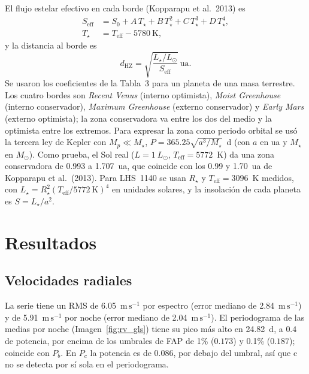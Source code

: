 \documentclass[twocolumn,aps,pra,11pt]{revtex4-2}
\newcommand{\Msun}{\ensuremath{M_\odot}}
\newcommand{\Lsun}{\ensuremath{L_\odot}}
\newcommand{\ms}{\ensuremath{\mathrm{m\,s^{-1}}}}
\begin{document}
El flujo estelar efectivo en cada borde (Kopparapu et al.\ 2013) es
\begin{equation}
  \begin{split}
  S_\mathrm{eff} &= S_0 + A\,T_\star + B\,T_\star^2 + C\,T_\star^3 + D\,T_\star^4,\\
  T_\star &= T_\mathrm{eff} - 5780~\mathrm{K},
  \end{split}
  \label{eq:seff}
\end{equation}
y la distancia al borde es
\begin{equation}
  d_\mathrm{HZ} = \sqrt{\frac{L_\star/\Lsun}{S_\mathrm{eff}}}~\mathrm{ua}.
  \label{eq:dhz}
\end{equation}
Se usaron los coeficientes de la Tabla~3 para un planeta de una masa terrestre. Los cuatro bordes son \emph{Recent Venus} (interno optimista), \emph{Moist Greenhouse} (interno conservador), \emph{Maximum Greenhouse} (externo conservador) y \emph{Early Mars} (externo optimista); la zona conservadora va entre los dos del medio y la optimista entre los extremos. Para expresar la zona como periodo orbital se usó la tercera ley de Kepler con $M_p \ll M_\star$, $P = 365.25\sqrt{a^3/M_\star}$~d (con $a$ en ua y $M_\star$ en \Msun). Como prueba, el Sol real ($L = 1~\Lsun$, $T_\mathrm{eff} = 5772$~K) da una zona conservadora de 0.993 a 1.707~ua, que coincide con los 0.99 y 1.70~ua de Kopparapu et al.\ (2013). Para LHS~1140 se usan $R_\star$ y $T_\mathrm{eff}=3096$~K medidos, con $L_\star = R_\star^2 (T_\mathrm{eff}/5772~\mathrm{K})^4$ en unidades solares, y la insolación de cada planeta es $S = L_\star/a^2$.

\section{Resultados}

\subsection{Velocidades radiales}

La serie tiene un RMS de 6.05~\ms{} por espectro (error mediano de 2.84~\ms) y de 5.91~\ms{} por noche (error mediano de 2.04~\ms). El periodograma de las medias por noche (Imagen~\ref{fig:rv_gls}) tiene su pico más alto en 24.82~d, a $0.4$ de potencia, por encima de los umbrales de FAP de 1\% ($0.173$) y 0.1\% ($0.187$); coincide con $P_b$. En $P_c$ la potencia es de $0.086$, por debajo del umbral, así que c no se detecta por sí sola en el periodograma.
\end{document}
